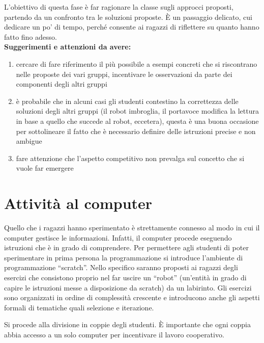 \documentclass[12pt]{article}
\begin{document}
L’obiettivo di questa fase è far ragionare la classe sugli approcci proposti, partendo da un confronto tra le soluzioni proposte. È un passaggio delicato, cui dedicare un po’ di tempo, perché consente ai ragazzi di riflettere su quanto hanno fatto fino adesso.\\

\textbf{Suggerimenti e attenzioni da avere:}
\begin{enumerate}
\item cercare di fare riferimento il più possibile a esempi concreti che si riscontrano nelle proposte dei vari gruppi, incentivare le osservazioni da parte dei componenti degli altri gruppi
\item è probabile che in alcuni casi gli studenti contestino la correttezza delle soluzioni degli altri gruppi (il robot imbroglia, il portavoce modifica la lettura in base a quello che succede al robot, eccetera), questa è una buona occasione per sottolineare il fatto che è necessario definire delle istruzioni precise e non ambigue
\item fare attenzione che l’aspetto competitivo non prevalga sul concetto che si vuole far emergere
\end{enumerate}

\section{Attività al computer}

Quello che i ragazzi hanno sperimentato è strettamente connesso al modo in cui il computer gestisce le informazioni. Infatti, il computer procede eseguendo istruzioni che è in grado di comprendere.
Per permettere agli studenti di poter sperimentare in prima persona la programmazione si introduce l’ambiente di programmazione ``scratch”. Nello specifico saranno proposti ai ragazzi degli esercizi che consistono proprio nel far uscire un “robot” (un’entità in grado di capire le istruzioni messe a disposizione da scratch) da un labirinto. Gli esercizi sono organizzati in ordine di complessità crescente e introducono anche gli aspetti formali di tematiche quali selezione e iterazione. 

Si procede alla divisione in coppie degli studenti. È importante che ogni coppia abbia accesso a un solo computer per incentivare il lavoro cooperativo. 
\end{document}

